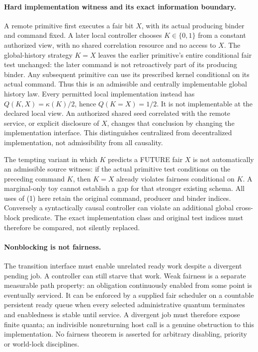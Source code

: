 \documentclass{article}
\begin{document}
\paragraph{Hard implementation witness and its exact information boundary.}
A remote primitive first executes a fair bit $X$, with its actual producing binder and command fixed. A later local controller chooses $K\in\{0,1\}$ from a constant authorized view, with no shared correlation resource and no access to $X$. The global-history strategy $K=X$ leaves the earlier primitive's entire conditional fair test unchanged: the later command is not retroactively part of its producing binder. Any subsequent primitive can use its prescribed kernel conditional on its actual command. Thus this is an admissible and centrally implementable global history law. Every permitted local implementation instead has $Q(K,X)=\kappa(K)/2$, hence $Q(K=X)=1/2$. It is not implementable at the declared local view. An authorized shared seed correlated with the remote service, or explicit disclosure of $X$, changes that conclusion by changing the implementation interface. This distinguishes centralized from decentralized implementation, not admissibility from all causality.

The tempting variant in which $K$ predicts a FUTURE fair $X$ is not automatically an admissible source witness: if the actual primitive test conditions on the preceding command $K$, then $K=X$ already violates fairness conditional on $K$. A marginal-only toy cannot establish a gap for that stronger existing schema. All uses of (1) here retain the original command, producer and binder indices. Conversely a syntactically causal controller can violate an additional global cross-block predicate. The exact implementation class and original test indices must therefore be compared, not silently replaced.

\paragraph{Nonblocking is not fairness.}
The transition interface must enable unrelated ready work despite a divergent pending job. A controller can still starve that work. Weak fairness is a separate measurable path property: an obligation continuously enabled from some point is eventually serviced. It can be enforced by a supplied fair scheduler on a countable persistent ready queue when every selected administrative quantum terminates and enabledness is stable until service. A divergent job must therefore expose finite quanta; an indivisible nonreturning host call is a genuine obstruction to this implementation. No fairness theorem is asserted for arbitrary disabling, priority or world-lock disciplines.
\end{document}
